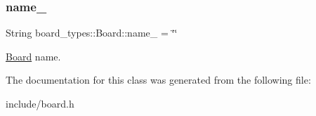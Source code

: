 \subsubsection{\texorpdfstring{name\+\_\+}{name\_}}
{\footnotesize\ttfamily String board\+\_\+types\+::\+Board\+::name\+\_\+ = \char`\"{}\char`\"{}\hspace{0.3cm}{\ttfamily [protected]}}

\mbox{\hyperlink{classboard__types_1_1Board}{Board}} name. 

The documentation for this class was generated from the following file\+:\begin{DoxyCompactItemize}
\item 
include/board.\+h\end{DoxyCompactItemize}
